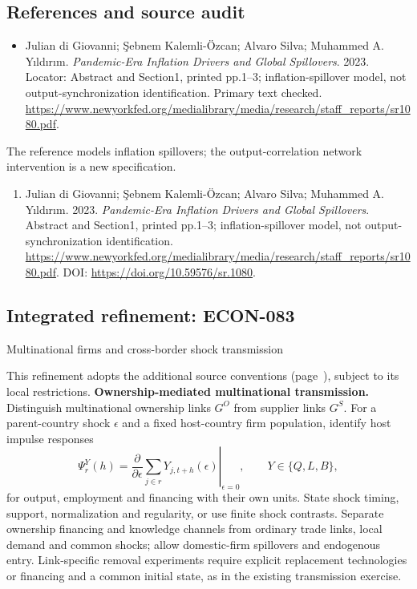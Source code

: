 \documentclass[11pt,a4paper]{article}
\begin{document}
\subsection*{References and source audit}
\begin{itemize}
\item Julian di Giovanni; \c{S}ebnem Kalemli-\"{O}zcan; Alvaro Silva; Muhammed A. Y\i{}ld\i{}r\i{}m. \emph{Pandemic-Era Inflation Drivers and Global Spillovers}. 2023. Locator: Abstract and Section1, printed pp.1--3; inflation-spillover model, not output-synchronization identification. Primary text checked. \url{https://www.newyorkfed.org/medialibrary/media/research/staff_reports/sr1080.pdf}.
\end{itemize}
The reference models inflation spillovers; the output-correlation network intervention is a new specification.
\begin{enumerate}\raggedright
\item\hypertarget{definitions:source:30007519:1}{} Julian di Giovanni; \c{S}ebnem Kalemli-\"{O}zcan; Alvaro Silva; Muhammed A. Y\i{}ld\i{}r\i{}m. 2023. \emph{Pandemic-Era Inflation Drivers and Global Spillovers}. Abstract and Section1, printed pp.1--3; inflation-spillover model, not output-synchronization identification.
\url{https://www.newyorkfed.org/medialibrary/media/research/staff_reports/sr1080.pdf}.
DOI: \url{https://doi.org/10.59576/sr.1080}.
\end{enumerate}

\subsection*{Integrated refinement: ECON-083}
{\sffamily\small\color{muted}Multinational firms and cross-border shock transmission\par}
This refinement adopts the additional source conventions
(page~\pageref{audited:conventions}), subject to its local restrictions.
\textbf{Ownership-mediated multinational transmission.}
Distinguish multinational ownership links $G^O$ from supplier links $G^S$.
For a parent-country shock $\epsilon$ and a fixed host-country firm population,
identify host impulse responses
\[
\Psi_r^Y(h)=\left.\frac{\partial}{\partial\epsilon}
                \sum_{j\in r}Y_{j,t+h}(\epsilon)\right|_{\epsilon=0},
\qquad Y\in\{Q,L,B\},
\]
for output, employment and financing with their own units. State shock timing,
support, normalization and regularity, or use finite shock contrasts. Separate
ownership financing and knowledge channels from ordinary trade links, local
demand and common shocks; allow domestic-firm spillovers and endogenous entry.
Link-specific removal experiments require explicit replacement technologies or
financing and a common initial state, as in the existing transmission exercise.
\end{document}
